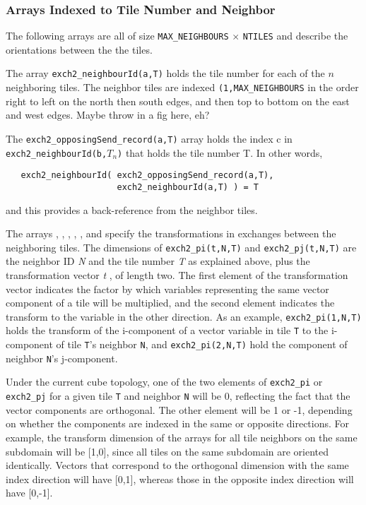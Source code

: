 \subsubsection{Arrays Indexed to Tile Number and Neighbor}

The following arrays are all of size \texttt{MAX\_NEIGHBOURS} $\times$
\texttt{NTILES} and describe the orientations between the the tiles.

The array \texttt{exch2\_neighbourId(a,T)} holds the tile number for
each of the $n$ neighboring tiles.  The neighbor tiles are indexed
\texttt{(1,MAX\_NEIGHBOURS} in the order right to left on the north
then south edges, and then top to bottom on the east and west edges.
Maybe throw in a fig here, eh?

The \texttt{exch2\_opposingSend\_record(a,T)} array holds the index c
in \texttt{exch2\_neighbourId(b,$T_{n}$)} that holds the tile number T.
In other words, 
\begin{verbatim}
   exch2_neighbourId( exch2_opposingSend_record(a,T),
                      exch2_neighbourId(a,T) ) = T
\end{verbatim}
and this provides a back-reference from the neighbor tiles.

The arrays ,
, ,
, , and
 specify the transformations in
exchanges between the neighboring tiles.  The dimensions of
\texttt{exch2\_pi(t,N,T)} and \texttt{exch2\_pj(t,N,T)} are the
neighbor ID \textit{N} and the tile number \textit{T} as explained
above, plus the transformation vector {\em t }, of length two.  The
first element of the transformation vector indicates the factor by
which variables representing the same vector component of a tile will
be multiplied, and the second element indicates the transform to the
variable in the other direction.  As an example,
\texttt{exch2\_pi(1,N,T)} holds the transform of the i-component of a
vector variable in tile \texttt{T} to the i-component of tile
\texttt{T}'s neighbor \texttt{N}, and \texttt{exch2\_pi(2,N,T)} hold
the component of neighbor \texttt{N}'s j-component.

Under the current cube topology, one of the two elements of
\texttt{exch2\_pi} or \texttt{exch2\_pj} for a given tile \texttt{T}
and neighbor \texttt{N} will be 0, reflecting the fact that the vector
components are orthogonal.  The other element will be 1 or -1,
depending on whether the components are indexed in the same or
opposite directions.  For example, the transform dimension of the
arrays for all tile neighbors on the same subdomain will be [1,0],
since all tiles on the same subdomain are oriented identically.
Vectors that correspond to the orthogonal dimension with the same
index direction will have [0,1], whereas those in the opposite index
direction will have [0,-1].


